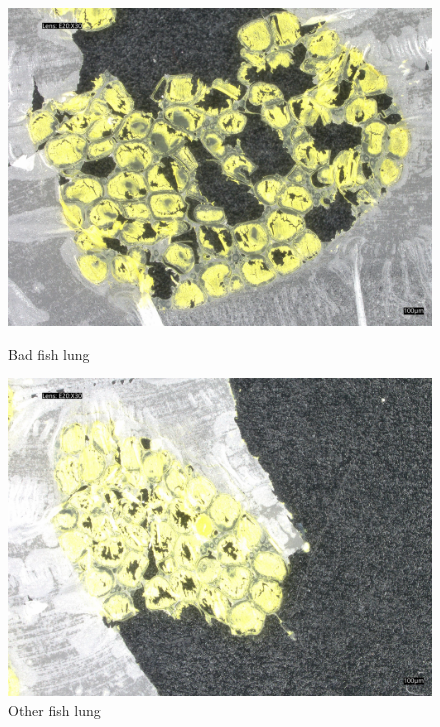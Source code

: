 \begin{figure}[H]
    \centering
    \begin{minipage}{0.45\textwidth}
        \centering
        \includegraphics[width=\textwidth]{./fig/fish_lung/bad20240313_140952.jpg}
        \caption{Bad fish lung}
        \label{fig:bad_fish_lung}
    \end{minipage}
    \begin{minipage}{0.45\textwidth}
        \centering
        \includegraphics[width=\textwidth]{./fig/fish_lung/other20240313_141858.jpg}
        \caption{Other fish lung}
        \label{fig:other_fish_lung}
\end{minipage}
\end{figure}

